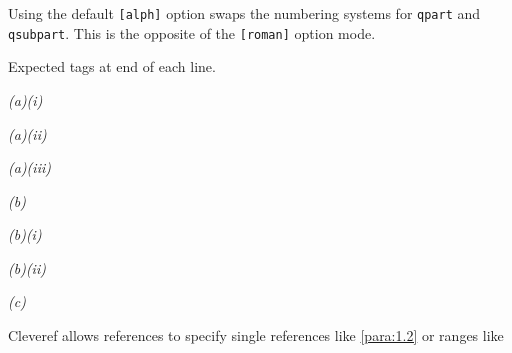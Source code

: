 \documentclass[a4paper,12pt]{article}
\begin{document}
	Using the default \verb|[alph]| option swaps the numbering systems for \verb|qpart| and \verb|qsubpart|. This is the opposite of the \verb|[roman]| option mode.
	
	Expected tags at end of each line.
	
	
	\begin{question}
	\qpart\qsubpart
	\lipsum[1-2] \emph{(a)(i)}\label{para:1.1.1}
	
	\qsubpart
	\lipsum[3-4] \emph{(a)(ii)}\label{para:1.1.2}
	
	\qsubpart
	\lipsum[5-6] \emph{(a)(iii)}\label{para:1.1.3}
	
	\qpart
	\lipsum[7-8] \emph{(b)}\label{para:1.2}
	
	\qsubpart
	\lipsum[9-10] \emph{(b)(i)}\label{para:1.2.1}
	
	\qsubpart
	\lipsum[11-12] \emph{(b)(ii)}\label{para:1.2.2}
	
	\qpart
	\lipsum[13-14] \emph{(c)}\label{para:3}
\end{question}

Cleveref allows references to specify single references like \cref{para:1.2} or ranges like 
\end{document}
